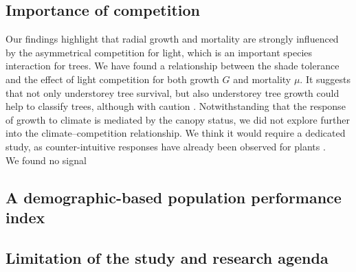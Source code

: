 \subsection{Importance of competition}
Our findings highlight that radial growth and mortality are strongly influenced by the asymmetrical competition for light, which is an important species interaction for trees. We have found a relationship between the shade tolerance and the effect of light competition for both growth $ G $ and mortality $ \mu $. It suggests that not only understorey tree survival, but also understorey tree growth could help to classify trees, although with caution \citep{Feng2018}. Notwithstanding that the response of growth to climate is mediated by the canopy status, we did not explore further into the climate--competition relationship. We think it would require a dedicated study, as counter-intuitive responses have already been observed for plants \citep{Holmgren2012}. \\

We found no signal 

\subsection{A demographic-based population performance index}

\subsection{Limitation of the study and research agenda}

